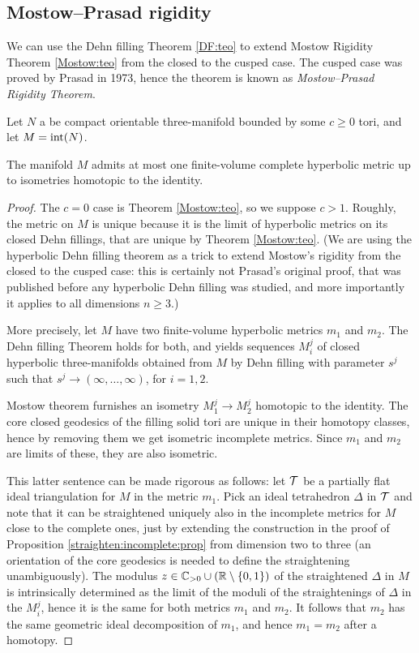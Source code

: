 \subsection{Mostow--Prasad rigidity}
We can use the Dehn filling Theorem \ref{DF:teo} to extend Mostow Rigidity Theorem \ref{Mostow:teo} from the closed to the cusped case. The cusped case was proved by Prasad in 1973, hence the theorem is known as \emph{Mostow--Prasad Rigidity Theorem}.

Let $N$ a be compact orientable three-manifold bounded by some $c\geqslant 0$ tori, and let $M={\rm int}(N)$.

\begin{teo}
The manifold $M$ admits at most one finite-volume complete hyperbolic metric up to isometries homotopic to the identity.
\end{teo}
\begin{proof}
The $c=0$ case is Theorem \ref{Mostow:teo}, so we suppose $c>1$. Roughly, the metric on $M$ is unique because it is the limit of hyperbolic metrics on its closed Dehn fillings, that are unique by Theorem \ref{Mostow:teo}. (We are using the hyperbolic Dehn filling theorem as a trick to extend Mostow's rigidity from the closed to the cusped case: this is certainly not Prasad's original proof, that was published before any hyperbolic Dehn filling was studied, and more importantly it applies to all dimensions $n\geqslant 3$.)

More precisely, let $M$ have two finite-volume hyperbolic metrics $m_1$ and $m_2$. The Dehn filling Theorem holds for both, and yields sequences $M_i^j$ of closed hyperbolic three-manifolds obtained from $M$ by Dehn filling with parameter $s^j$ such that  $s^j \to (\infty, \ldots, \infty)$, for $i=1,2$.

Mostow theorem furnishes an isometry $M_1^j \to M_2^j$ homotopic to the identity. The core closed geodesics of the filling solid tori are unique in their homotopy classes, hence by removing them we get isometric incomplete metrics. Since $m_1$ and $m_2$ are limits of these, they are also isometric.

This latter sentence can be made rigorous as follows: let $\mathcal{T}$ be a partially flat ideal triangulation for $M$ in the metric $m_1$. Pick an ideal tetrahedron $\Delta$ in $\mathcal{T}$ and note that it can be straightened uniquely also in the incomplete metrics for $M$ close to the complete ones, just by extending the construction in the proof of Proposition \ref{straighten:incomplete:prop} from dimension two to three (an orientation of the core geodesics is needed to define the straightening unambiguously). The modulus $z\in \mathbb{C}_{>0} \cup (\mathbb{R} \setminus \{0,1\})$ of the straightened $\Delta$ in $M$ is intrinsically determined as the limit of the moduli of the straightenings of $\Delta$ in the $M_i^j$, hence it is the same for both metrics $m_1$ and $m_2$. It follows that $m_2$ has the same geometric ideal decomposition of $m_1$, and hence $m_1=m_2$ after a homotopy. 
\end{proof}

